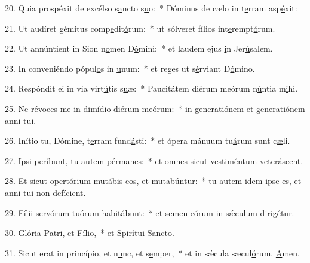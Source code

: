 20. Quia prospéxit de excélso s\uline{a}ncto s\uline{u}o:~* Dóminus de cælo in t\uline{e}rram asp\uline{é}xit:\par 
21. Ut audíret gémitus comp\uline{e}dit\uline{ó}rum:~* ut sólveret fílios int\uline{e}rempt\uline{ó}rum.\par 
22. Ut annúntient in Sion n\uline{o}men D\uline{ó}mini:~* et laudem ejus \uline{i}n Jer\uline{ú}salem.\par 
23. In conveniéndo pópul\uline{o}s in \uline{u}num:~* et reges ut s\uline{é}rviant D\uline{ó}mino.\par 
24. Respóndit ei in via virt\uline{ú}tis s\uline{u}æ:~* Paucitátem diérum meórum n\uline{ú}ntia m\uline{i}hi.\par 
25. Ne révoces me in dimídio di\uline{é}rum me\uline{ó}rum:~* in generatiónem et generatiónem \uline{a}nni t\uline{u}i.\par 
26. Inítio tu, Dómine, t\uline{e}rram fund\uline{á}sti:~* et ópera mánuum tu\uline{á}rum sunt c\uline{æ}li.\par 
27. Ipsi períbunt, tu \uline{au}tem p\uline{é}rmanes:~* et omnes sicut vestiméntum v\uline{e}ter\uline{á}scent.\par 
28. Et sicut opertórium mutábis eos, et m\uline{u}tab\uline{ú}ntur:~* tu autem idem ipse es, et anni tui n\uline{o}n def\uline{í}cient.\par 
29. Fílii servórum tuórum h\uline{a}bit\uline{á}bunt:~* et semen eórum in sǽculum d\uline{i}rig\uline{é}tur.\par 
30. Glória P\uline{a}tri, et F\uline{í}lio,~* et Spir\uline{í}tui S\uline{a}ncto.\par 
31. Sicut erat in princípio, et n\uline{u}nc, et s\uline{e}mper,~* et in sǽcula sæcul\uline{ó}rum. \uline{A}men.\par 
